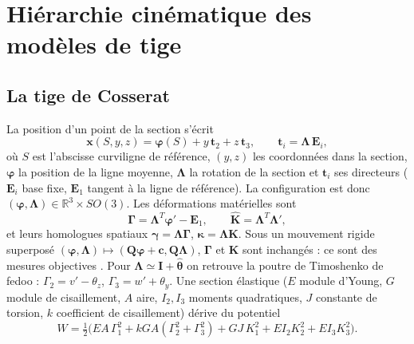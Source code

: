 \documentclass[11pt,a4paper]{article}
\newcommand{\hatv}[1]{\widehat{\bm{#1}}}
\newcommand{\Lam}{\bm{\Lambda}}
\newcommand{\Gam}{\bm{\Gamma}}
\newcommand{\Kv}{\mathbf{K}}
\begin{document}
\section{Hiérarchie cinématique des modèles de tige}

\subsection{La tige de Cosserat}
La position d'un point de la section s'écrit
\begin{equation}
\mathbf x(S,y,z)=\bm\varphi(S)+y\,\mathbf t_2+z\,\mathbf t_3,\qquad
\mathbf t_i=\Lam\,\mathbf E_i,
\end{equation}
où $S$ est l'abscisse curviligne de référence, $(y,z)$ les coordonnées dans
la section, $\bm\varphi$ la position de la ligne moyenne, $\Lam$ la rotation de la
section et $\mathbf t_i$ ses directeurs ($\mathbf E_i$ base fixe, $\mathbf E_1$
tangent à la ligne de référence). La configuration est donc
$(\bm\varphi,\Lam)\in\mathbb R^3\times SO(3)$. Les déformations
matérielles sont
\begin{equation}
\Gam=\Lam^T\bm\varphi'-\mathbf E_1,\qquad \hatv{K}=\Lam^T\Lam',
\end{equation}
et leurs homologues spatiaux $\bm\gamma=\Lam\Gam$, $\bm\kappa=\Lam\Kv$.
Sous un mouvement rigide superposé
$(\bm\varphi,\Lam)\mapsto(\mathbf Q\bm\varphi+\mathbf c,\mathbf Q\Lam)$,
$\Gam$ et $\Kv$ sont inchangés : ce sont des mesures objectives
\cite{reissner1981,simo1985}. Pour $\Lam\simeq\mathbf I+\hatv\theta$ on
retrouve la poutre de Timoshenko de fedoo : $\Gamma_2=v'-\theta_z$,
$\Gamma_3=w'+\theta_y$. Une section élastique ($E$ module d'Young, $G$ module de cisaillement, $A$
aire, $I_2,I_3$ moments quadratiques, $J$ constante de torsion, $k$ coefficient de
cisaillement) dérive du potentiel
\begin{equation}
W=\tfrac12\big(EA\,\Gamma_1^2+kGA(\Gamma_2^2+\Gamma_3^2)+GJ\,K_1^2+EI_2K_2^2+EI_3K_3^2\big).
\end{equation}
\end{document}
